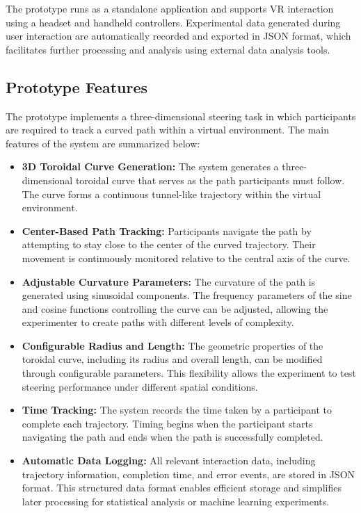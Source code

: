 \documentclass[sigconf]{acmart}
\begin{document}
The prototype runs as a standalone application and supports VR interaction using a headset and handheld controllers. Experimental data generated during user interaction are automatically recorded and exported in JSON format, which facilitates further processing and analysis using external data analysis tools.

\subsection{Prototype Features}

The prototype implements a three-dimensional steering task in which participants are required to track a curved path within a virtual environment. The main features of the system are summarized below:

\begin{itemize}

\item \textbf{3D Toroidal Curve Generation:}  
The system generates a three-dimensional toroidal curve that serves as the path participants must follow. The curve forms a continuous tunnel-like trajectory within the virtual environment.

\item \textbf{Center-Based Path Tracking:}  
Participants navigate the path by attempting to stay close to the center of the curved trajectory. Their movement is continuously monitored relative to the central axis of the curve.

\item \textbf{Adjustable Curvature Parameters:}  
The curvature of the path is generated using sinusoidal components. The frequency parameters of the sine and cosine functions controlling the curve can be adjusted, allowing the experimenter to create paths with different levels of complexity.

\item \textbf{Configurable Radius and Length:}  
The geometric properties of the toroidal curve, including its radius and overall length, can be modified through configurable parameters. This flexibility allows the experiment to test steering performance under different spatial conditions.

\item \textbf{Time Tracking:}  
The system records the time taken by a participant to complete each trajectory. Timing begins when the participant starts navigating the path and ends when the path is successfully completed.

\item \textbf{Automatic Data Logging:}  
All relevant interaction data, including trajectory information, completion time, and error events, are stored in JSON format. This structured data format enables efficient storage and simplifies later processing for statistical analysis or machine learning experiments.

\end{itemize}
\end{document}
